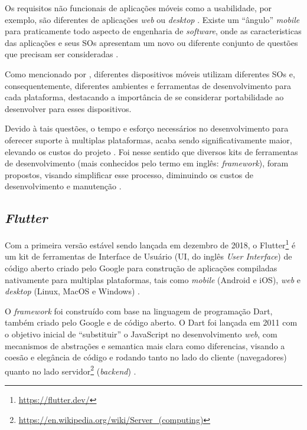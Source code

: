 Os requisitos não funcionais de aplicações móveis como a usabilidade, por exemplo, são diferentes de aplicações \emph{web} ou \emph{desktop} \cite{pressman2014software}. 
Existe um ``ângulo'' \emph{mobile} para praticamente todo aspecto de engenharia de \emph{software}, onde as caracteristicas
das aplicações e seus SOs apresentam um novo ou diferente conjunto de questões que precisam ser consideradas \cite{Wasserman2010}.

Como mencionado por , diferentes dispositivos móveis utilizam diferentes SOs e, consequentemente, diferentes
ambientes e ferramentas de desenvolvimento para cada plataforma, destacando a importância de se considerar portabilidade ao desenvolver para
esses dispositivos.

Devido à tais questões, o tempo e esforço necessários no desenvolvimento para oferecer suporte à multiplas plataformas, acaba sendo
significativamente maior, elevando os custos do projeto \cite{Henning2013,Wasserman2010}. Foi nesse sentido que diversos kits de ferramentas de
desenvolvimento (mais conhecidos pelo termo em inglês: \emph{framework}), foram propostos, visando simplificar esse processo, diminuindo os custos
de desenvolvimento e manutenção \cite{Martinez2017,Francese2015}.

\subsection{\emph{Flutter}}

Com a primeira versão estável sendo lançada em dezembro de 2018, o Flutter\footnote{\url{https://flutter.dev/}} é um kit de ferramentas de Interface
de Usuário (UI, do inglês \emph{User Interface}) de código aberto criado pelo Google para construção de aplicações compiladas nativamente
para multiplas plataformas, tais como \emph{mobile} (Android e iOS), \emph{web} e \emph{desktop} (Linux, MacOS e Windows) \cite{kuzmin2020experience}.

O \emph{framework} foi construído com base na linguagem de programação Dart, também criado pelo Google e de código aberto.
O Dart foi lançada em 2011 com o objetivo inicial de ``substituir'' o JavaScript no desenvolvimento \emph{web},
com mecanismos de abstrações e semantica mais clara como diferencias, visando a coesão e elegância de código e
rodando tanto no lado do cliente (navegadores) quanto no lado servidor\footnote{\url{https://en.wikipedia.org/wiki/Server_(computing)}}
(\emph{backend}) \cite{walrath2012dart}.

